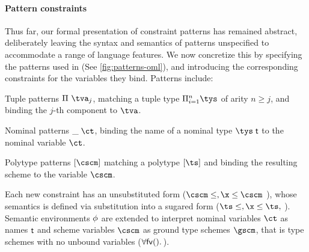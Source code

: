 \documentclass[acmsmall,screen,nonacm,review]{acmart}
\begin{document}
\paragraph{Pattern constraints}

Thus far, our formal presentation of constraint patterns has remained
abstract, deliberately leaving the syntax and semantics of patterns unspecified to
accommodate a range of language features. We now concretize this by specifying
the patterns used in \OML (See \cref{fig:patterns-oml}), and introducing the
corresponding constraints for the variables they bind.
%
Patterns include:
\begin{enumerate*}

  \item Tuple patterns $\cpatprod \tv j$, matching a tuple type $\Pi\iton
    \tys$ of arity $n \geq j$, and binding the $j$-th component to $\tv$.

  \item Nominal patterns $\cpatrcd \ct$, binding the name of a nominal type
    $\tys \Tapp$ to the nominal variable $\ct$.

  \item Polytype patterns $\cpatpoly \cscm$ matching a polytype $\tpoly \ts$ and
    binding the resulting scheme to the variable $\cscm$.

\end{enumerate*}

Each new constraint has an unsubstituted form ($\cscm \leq \t, \x \leq \cscm$
\etc), whose semantics is defined via substitution into a sugared form ($\ts
\leq \t, \x \leq \ts,$ \etc). Semantic environments $\phi$ are extended to
interpret nominal variables $\ct$ as names $\mathrel{\mathsf{t}}\mathclose{}$ and scheme variables $\cscm$ as
ground type schemes $\gscm$, that is type schemes with no unbound variables
(\ie $\forall {\mathsf{fv}({\relax})}.\,{\relax}$).
\end{document}
